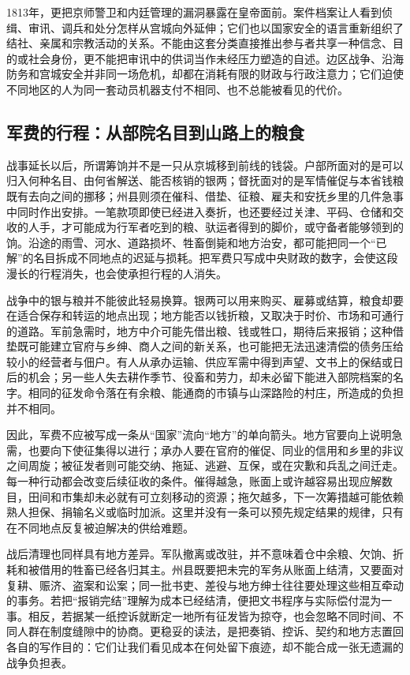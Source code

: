 1813年，更把京师警卫和内廷管理的漏洞暴露在皇帝面前。案件档案让人看到侦缉、审讯、调兵和处分怎样从宫城向外延伸；它们也以国家安全的语言重新组织了结社、亲属和宗教活动的关系。不能由这套分类直接推出参与者共享一种信念、目的或社会身份，更不能把审讯中的供词当作未经压力塑造的自述。边区战争、沿海防务和宫城安全并非同一场危机，却都在消耗有限的财政与行政注意力；它们迫使不同地区的人为同一套动员机器支付不相同、也不总能被看见的代价。

\subsection{军费的行程：从部院名目到山路上的粮食}

战事延长以后，所谓筹饷并不是一只从京城移到前线的钱袋。户部所面对的是可以归入何种名目、由何省解送、能否核销的银两；督抚面对的是军情催促与本省钱粮既有去向之间的挪移；州县则须在催科、借垫、征粮、雇夫和安抚乡里的几件急事中同时作出安排。一笔款项即使已经进入奏折，也还要经过关津、平码、仓储和交收的人手，才可能成为行军者吃到的粮、驮运者得到的脚价，或守备者能够领到的饷。沿途的雨雪、河水、道路损坏、牲畜倒毙和地方治安，都可能把同一个“已解”的名目拆成不同地点的迟延与损耗。把军费只写成中央财政的数字，会使这段漫长的行程消失，也会使承担行程的人消失。

战争中的银与粮并不能彼此轻易换算。银两可以用来购买、雇募或结算，粮食却要在适合保存和转运的地点出现；地方能否以钱折粮，又取决于时价、市场和可通行的道路。军前急需时，地方中介可能先借出粮、钱或牲口，期待后来报销；这种借垫既可能建立官府与乡绅、商人之间的新关系，也可能把无法迅速清偿的债务压给较小的经营者与佃户。有人从承办运输、供应军需中得到声望、文书上的保结或日后的机会；另一些人失去耕作季节、役畜和劳力，却未必留下能进入部院档案的名字。相同的征发命令落在有余粮、能通商的市镇与山深路险的村庄，所造成的负担并不相同。

因此，军费不应被写成一条从“国家”流向“地方”的单向箭头。地方官要向上说明急需，也要向下使征集得以进行；承办人要在官府的催促、同业的信用和乡里的非议之间周旋；被征发者则可能交纳、拖延、逃避、互保，或在灾歉和兵乱之间迁走。每一种行动都会改变后续征收的条件。催得越急，账面上或许越容易出现应解数目，田间和市集却未必就有可立刻移动的资源；拖欠越多，下一次筹措越可能依赖熟人担保、捐输名义或临时加派。这里并没有一条可以预先规定结果的规律，只有在不同地点反复被迫解决的供给难题。

战后清理也同样具有地方差异。军队撤离或改驻，并不意味着仓中余粮、欠饷、折耗和被借用的牲畜已经各归其主。州县既要把未完的军务从账面上结清，又要面对复耕、赈济、盗案和讼案；同一批书吏、差役与地方绅士往往要处理这些相互牵动的事务。若把“报销完结”理解为成本已经结清，便把文书程序与实际偿付混为一事。相反，若据某一纸控诉就断定一地所有征发皆为掠夺，也会忽略不同时间、不同人群在制度缝隙中的协商。更稳妥的读法，是把奏销、控诉、契约和地方志置回各自的写作目的：它们让我们看见成本在何处留下痕迹，却不能合成一张无遗漏的战争负担表。

